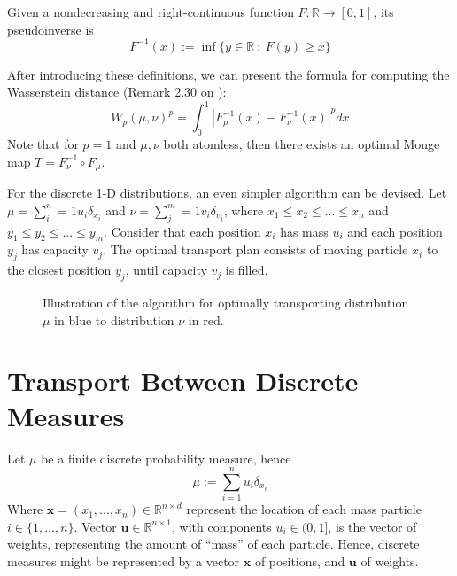 \begin{definition}
  Given a nondecreasing and right-continuous function $F:\mathbb R \to [0,1]$,
  its pseudoinverse is
  \begin{equation}
    F^{-1}(x):= \inf\{
    y \in \mathbb R \ : \ F(y) \geq x
    \}
  \end{equation}
  \label{def:pseudoinverse}
\end{definition}
After introducing these definitions, we can present the formula for computing the Wasserstein
distance (Remark 2.30 on \citet{peyre2019computational}):
\begin{equation}
  W_p(\mu,\nu)^p = \int_0^1| F_\mu^{-1}(x)- F_\nu^{-1}(x) |^p dx
\end{equation}
Note that for $p=1$ and $\mu,\nu$ both atomless, then
there exists an optimal Monge map $T = F_\nu^{-1} \circ F_\mu$.

For the discrete 1-D distributions, an even simpler algorithm can be devised. Let
$\mu = \sum^n_i=1 u_i \delta_{x_i}$ and
$\nu = \sum^m_j=1 v_i \delta_{v_j}$, where
$x_1\leq x_2 \leq ... \leq x_n$ and
$y_1\leq y_2 \leq ... \leq y_m$. Consider that each position $x_i$ has mass $u_i$
and each position $y_j$ has capacity $v_j$. The optimal transport plan
consists of moving particle $x_i$
to the closest position $y_j$, until capacity $v_j$ is filled.

\begin{figure}[H]
  \centering
  \def\svgscale{0.6}
  
  \caption{Illustration of the algorithm for optimally transporting distribution $\mu$ in blue
  to distribution $\nu$ in red.}
  \label{fig:ot-1d-discrete}
\end{figure}

\section{Transport Between Discrete Measures}

Let $\mu$ be a finite discrete probability measure, hence
\begin{equation}
  \mu := \sum^n_{i=1} u_i \delta_{x_i}
\end{equation}
Where $\mathbf x = (x_1,...,x_n) \in \mathbb R^{n\times d}$
represent the location of each mass particle $i \in \{1,...,n\}$. Vector
$\mathbf u \in \mathbb R^{n\times 1}$, with components $u_i \in (0,1]$,
is the vector of weights, representing the amount of ``mass'' of each particle. Hence,
discrete measures might be represented by a vector $\mathbf x$ of positions, and
$\mathbf u$ of weights.

